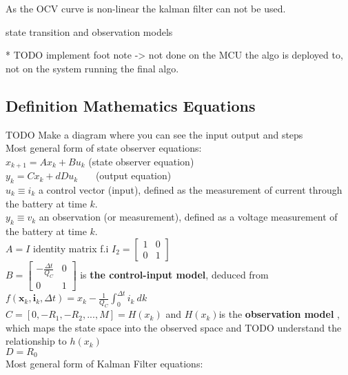 As the OCV curve is non-linear the kalman filter can not be used. 

state transition and observation models



* TODO implement foot note -> not done on the MCU the algo is deployed to, not on the system running the final algo. 

\subsection{Definition Mathematics Equations }
 
TODO Make a diagram where you can see the input output and steps\\


Most general form of  state observer equations: \\
$ x_{k+1}=Ax_{k}+Bu_{k} $ (state observer equation) \\
$ y_{k}=Cx_{k}+dDu_{k} $ \ \ \  (output equation)\\ 

$u_{k} \equiv i_{k}$ a control vector (input), defined as the measurement of current through the battery at time $k$. \\ 
$y_{k} \equiv v_{k}$ an observation (or measurement), defined as a voltage measurement of the battery at time $k$. \\
$A = I$  identity matrix f.i $I_{2}=\begin{bmatrix}1&0\\0&1\end{bmatrix}$ \\
$B = \begin{bmatrix}-\frac{\Delta t}{{Q_{C}}}&0\\0&1\end{bmatrix} $  is \textbf{the control-input model}, deduced from  $f({\boldsymbol {x}}_{k},{\boldsymbol {i}}_{k},\Delta t) =  {x}_{k} - \frac{1}{{Q_{C}}}\int_{0}^{\Delta t} {i_{k}\ dk} $ \\
$ C = [0, -R_1, -R_2, ..., M] = H(x_k) $ and $H(x_k) $is the \textbf{observation model} , which maps the state space into the observed space and TODO understand the relationship to $ h(x_k)$ \\ 
$ D = R_0 $ \\


Most general form of Kalman Filter equations: \\

